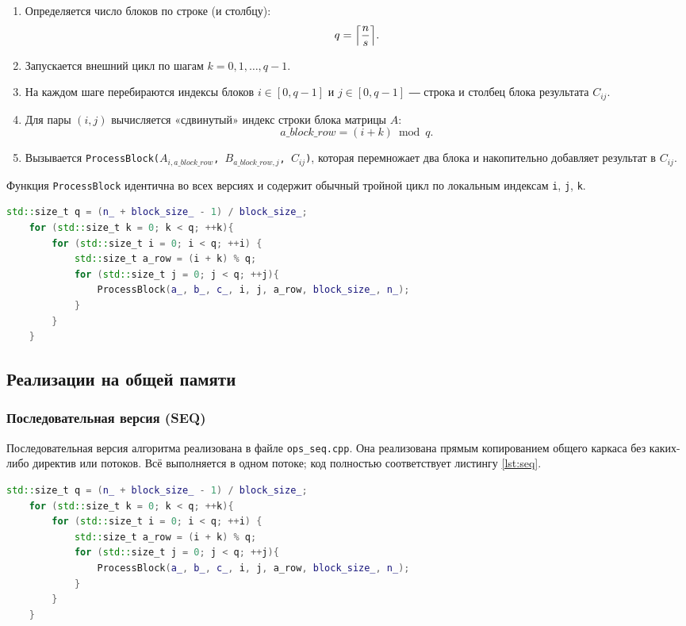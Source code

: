 \documentclass[12pt,a4paper]{extarticle}
\begin{document}
\begin{enumerate}
	\item Определяется число блоков по строке (и столбцу):
	\[
	q=\Bigl\lceil \frac{n}{s}\Bigr\rceil.
	\]
	\item Запускается внешний цикл по шагам
	$k=0,1,\dots,q-1$.
	\item На каждом шаге перебираются индексы блоков
	$i\in[0,q-1]$ и $j\in[0,q-1]$ ― строка и столбец блока результата $C_{ij}$.
	\item Для пары $(i,j)$ вычисляется «сдвинутый» индекс строки блока матрицы $A$:
	\[
	a\_block\_row = (i+k)\bmod q.
	\]
	\item Вызывается
	\texttt{ProcessBlock($A_{i,a\_block\_row}$, $B_{a\_block\_row,j}$, $C_{ij}$)},
	которая перемножает два блока и накопительно добавляет результат в $C_{ij}$.
\end{enumerate}

Функция \texttt{ProcessBlock} идентична во всех версиях и содержит обычный тройной цикл
по локальным индексам \texttt{i}, \texttt{j}, \texttt{k}.

\vspace{1em}
\begin{lstlisting}[language=C++,basicstyle=\ttfamily\small,
	caption={Общий каркас цикла RunImpl}]
	std::size_t q = (n_ + block_size_ - 1) / block_size_;
	for (std::size_t k = 0; k < q; ++k){
		for (std::size_t i = 0; i < q; ++i) {
			std::size_t a_row = (i + k) % q;
			for (std::size_t j = 0; j < q; ++j){
				ProcessBlock(a_, b_, c_, i, j, a_row, block_size_, n_);
			}
		}
	}
\end{lstlisting}

\subsection{Реализации на общей памяти}

\subsubsection*{Последовательная версия (SEQ)}
Последовательная версия алгоритма реализована в файле \texttt{ops\_seq.cpp}. Она реализована прямым копированием общего каркаса без каких-либо директив или потоков.
Всё выполняется в одном потоке; код полностью соответствует листингу \ref{lst:seq}.
\begin{lstlisting}[language=C++,basicstyle=\ttfamily\small,
	caption={RunImpl в последовательной версии},
	label={lst:seq}]
	std::size_t q = (n_ + block_size_ - 1) / block_size_;
	for (std::size_t k = 0; k < q; ++k){
		for (std::size_t i = 0; i < q; ++i) {
			std::size_t a_row = (i + k) % q;
			for (std::size_t j = 0; j < q; ++j){
				ProcessBlock(a_, b_, c_, i, j, a_row, block_size_, n_);
			}
		}
	}
\end{lstlisting}
\end{document}
